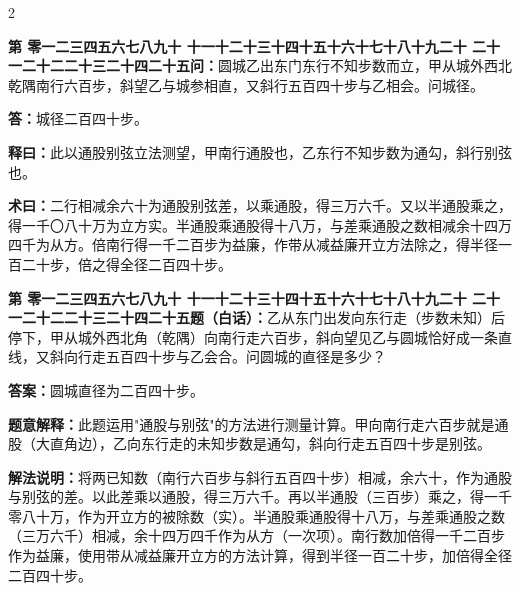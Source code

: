 \documentclass[10pt,a4paper]{article}
\newcounter{probnum}
\newcounter{probnumvol}[section]
\newcommand{\chnum}[1]{%
  \ifcase#1 零\or 一\or 二\or 三\or 四\or 五\or 六\or 七\or 八\or 九\or 十\or
    十一\or 十二\or 十三\or 十四\or 十五\or 十六\or 十七\or 十八\or 十九\or 二十\or
    二十一\or 二十二\or 二十三\or 二十四\or 二十五\fi}
\newcommand{\problemclassical}[1]{%
  \stepcounter{probnumvol}%
  \par\noindent
  \textcolor{classicalcolor}{\textbf{第\chnum{\value{probnumvol}}问：}}#1\par\smallskip
}
\newcommand{\problemmodern}[1]{%
  \par\noindent
  \textcolor{moderncolor}{\textbf{第\chnum{\value{probnumvol}}题（白话）：}}#1\par\smallskip
}
\newcommand{\answerclassical}[1]{%
  \par\noindent\textcolor{classicalcolor}{\textbf{答：}}#1\par
}
\newcommand{\answermodern}[1]{%
  \par\noindent\textcolor{moderncolor}{\textbf{答案：}}#1\par
}
\newcommand{\shiyiclassical}[1]{%
  \par\noindent\textcolor{classicalcolor}{\textbf{释曰：}}#1\par
}
\newcommand{\shiyimodern}[1]{%
  \par\noindent\textcolor{moderncolor}{\textbf{题意解释：}}#1\par
}
\newcommand{\shuyueclassical}[1]{%
  \par\noindent\textcolor{classicalcolor}{\textbf{术曰：}}#1\par
}
\newcommand{\shuyuemodern}[1]{%
  \par\noindent\textcolor{moderncolor}{\textbf{解法说明：}}#1\par
}
\begin{document}
\vspace{0.3cm}

\setcounter{probnumvol}{0}

\begin{paracol}{2}

\problemclassical{圆城乙出东门东行不知步数而立，甲从城外西北乾隅南行六百步，斜望乙与城参相直，又斜行五百四十步与乙相会。问城径。}

\answerclassical{城径二百四十步。}

\shiyiclassical{此以通股别弦立法测望，甲南行通股也，乙东行不知步数为通勾，斜行别弦也。}

\shuyueclassical{二行相减余六十为通股别弦差，以乘通股，得三万六千。又以半通股乘之，得一千〇八十万为立方实。半通股乘通股得十八万，与差乘通股之数相减余十四万四千为从方。倍南行得一千二百步为益廉，作带从减益廉开立方法除之，得半径一百二十步，倍之得全径二百四十步。}

\switchcolumn

\problemmodern{乙从东门出发向东行走（步数未知）后停下，甲从城外西北角（乾隅）向南行走六百步，斜向望见乙与圆城恰好成一条直线，又斜向行走五百四十步与乙会合。问圆城的直径是多少？}

\answermodern{圆城直径为二百四十步。}

\shiyimodern{此题运用"通股与别弦"的方法进行测量计算。甲向南行走六百步就是通股（大直角边），乙向东行走的未知步数是通勾，斜向行走五百四十步是别弦。}

\shuyuemodern{将两已知数（南行六百步与斜行五百四十步）相减，余六十，作为通股与别弦的差。以此差乘以通股，得三万六千。再以半通股（三百步）乘之，得一千零八十万，作为开立方的被除数（实）。半通股乘通股得十八万，与差乘通股之数（三万六千）相减，余十四万四千作为从方（一次项）。南行数加倍得一千二百步作为益廉，使用带从减益廉开立方的方法计算，得到半径一百二十步，加倍得全径二百四十步。}

\end{paracol}

\vspace{0.3cm}
\end{document}
